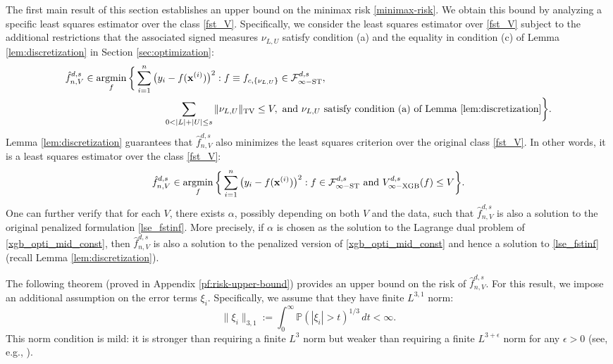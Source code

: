 \documentclass[10pt]{article}
\renewcommand{\P}{{\mathbb P}}
\newcommand{\fstinf}{{\mathcal{F}^{d, s}_{\infty-\text{ST}}}}
\newcommand{\vinfxgb}{{V^{d, s}_{\infty-\text{XGB}}}}
\newcommand{\lsefstinf}{{\hat{f}^{d, s}_{n, V}}}
\newcommand{\xbf}{{\mathbf{x}}}
\def\argmin{\mathop{\rm argmin}}
\begin{document}
The first main result of this section establishes an upper bound 
on the minimax risk \eqref{minimax-risk}. We obtain this bound 
by analyzing a specific least squares estimator over the class 
\eqref{fst_V}. Specifically, we consider the least squares 
estimator over \eqref{fst_V} subject to the additional 
restrictions that the associated signed measures $\nu_{L, U}$ 
satisfy condition (a) and the equality in condition (c) of 
Lemma \ref{lem:discretization} in Section \ref{sec:optimization}:
\begin{equation}\label{xgb_opti_mid_const}
\begin{aligned}
    &\lsefstinf \in \argmin_{f} 
    \bigg\{\sum_{i = 1}^n \big(y_i - f(\xbf^{(i)})\big)^2: 
    f \equiv f_{c, \{\nu_{L, U}\}} \in \fstinf, \\
    &\qquad \qquad \qquad \qquad \qquad 
    \sum_{0 < |L| + |U| \le s} \|\nu_{L, U}\|_{\text{TV}} 
    \le V, 
    \text{ and } \nu_{L, U} \text{ satisfy condition (a) of 
    Lemma \ref{lem:discretization}} \bigg\}.
\end{aligned}
\end{equation}
Lemma \ref{lem:discretization} guarantees that $\lsefstinf$
also minimizes the least squares criterion over the original 
class \eqref{fst_V}. In other words, it is a least 
squares estimator over the class \eqref{fst_V}:
\begin{equation*}
    \lsefstinf \in \argmin_{f} 
    \bigg\{\sum_{i = 1}^n \big(y_i - f(\xbf^{(i)})\big)^2: 
    f \in \fstinf \text{ and } \vinfxgb(f) \le V \bigg\}.
\end{equation*}
One can further verify that for each $V$, there exists 
$\alpha$, possibly depending on both $V$ and the data, such that 
$\lsefstinf$ is also a solution to the original penalized 
formulation \eqref{lse_fstinf}. More precisely, if $\alpha$ is 
chosen as the solution to the Lagrange dual problem of 
\eqref{xgb_opti_mid_const}, then $\lsefstinf$ is also a solution 
to the penalized version of \eqref{xgb_opti_mid_const} and hence 
a solution to \eqref{lse_fstinf} (recall 
Lemma \ref{lem:discretization}).

The following theorem (proved in Appendix \ref{pf:risk-upper-bound}) 
provides an upper bound on the risk of $\lsefstinf$. For this 
result, we impose an additional assumption on the error terms 
$\xi_i$. Specifically, we assume that they have finite 
$L^{3, 1}$ norm:
\begin{equation}\label{error-l31-norm}
    \| \xi_i \|_{3, 1} 
    := \int_{0}^{\infty} \P(|\xi_i| > t)^{1/3} \, dt 
    < \infty.
\end{equation}
This norm condition is mild: it is stronger than requiring a 
finite $L^3$ norm but weaker than requiring a finite 
$L^{3 + \epsilon}$ norm for any $\epsilon > 0$ (see, e.g., 
\citet[Chapter 1.4]{loukas2014classical}).
\end{document}
